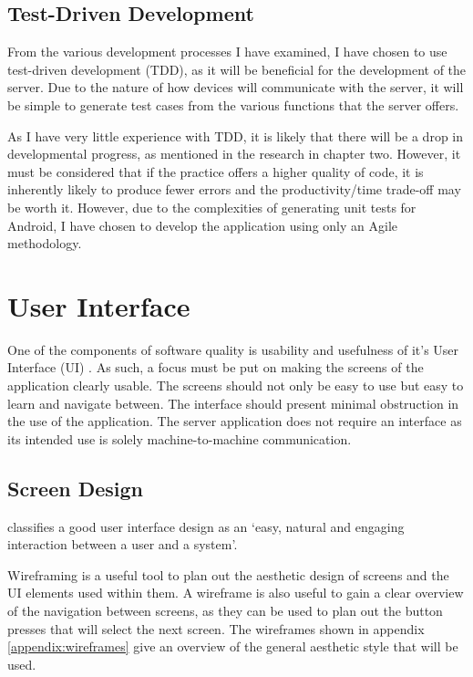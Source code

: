 \subsection{Test-Driven Development}
From the various development processes I have examined, I have chosen to use test-driven development (TDD), as it will be beneficial for the development of the server.
Due to the nature of how devices will communicate with the server, it will be simple to generate test cases from the various functions that the server offers.

As I have very little experience with TDD, it is likely that there will be a drop in developmental progress, as mentioned in the research in chapter two.
However, it must be considered that if the practice offers a higher quality of code, it is inherently likely to produce fewer errors and the productivity/time trade-off may be worth it.
However, due to the complexities of generating unit tests for Android, I have chosen to develop the application using only an Agile methodology.

\section{User Interface}
One of the components of software quality is usability and usefulness of it's User Interface (UI) \citep{isosoftwarequality}. 
As such, a focus must be put on making the screens of the application clearly usable.
The screens should not only be easy to use but easy to learn and navigate between. The interface should present minimal obstruction in the use of the application. 
The server application does not require an interface as its intended use is solely machine-to-machine communication.

\subsection{Screen Design}
\cite{stone2005user} classifies a good user interface design as an `easy, natural and engaging interaction between a user and a system'.

Wireframing is a useful tool to plan out the aesthetic design of screens and the UI elements used within them.
A wireframe is also useful to gain a clear overview of the navigation between screens, as they can be used to plan out the button presses that will select the next screen.
The wireframes shown in appendix \ref{appendix:wireframes} give an overview of the general aesthetic style that will be used.

